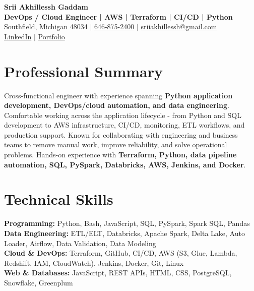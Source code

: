 \documentclass[letterpaper,10pt]{article}
\begin{document}
\fontsize{9.35pt}{10.45pt}\selectfont

\begin{center}
    {\LARGE \textbf{Srii Akhillessh Gaddam}} \\[-1pt]
    \textbf{DevOps / Cloud Engineer | AWS | Terraform | CI/CD | Python} \\[2pt]
    Southfield, Michigan 48034 $|$
    \href{tel:6468752400}{646-875-2400} $|$
    \href{mailto:sriiakhillessh@gmail.com}{sriiakhillessh@gmail.com} \\[1pt]
    \href{https://www.linkedin.com/in/srii-akhiilessh-gaddam-b48668191/}{LinkedIn} $|$
    \href{https://sriiakhillesshg.github.io/portfolio/}{Portfolio}
\end{center}
\vspace{-8pt}

\section{Professional Summary}
\small{Cross-functional engineer with experience spanning \textbf{Python application development, DevOps/cloud automation, and data engineering}. Comfortable working across the application lifecycle - from Python and SQL development to AWS infrastructure, CI/CD, monitoring, ETL workflows, and production support. Known for collaborating with engineering and business teams to remove manual work, improve reliability, and solve operational problems. Hands-on experience with \textbf{Terraform, Python, data pipeline automation, SQL, PySpark, Databricks, AWS, Jenkins, and Docker}.}

\section{Technical Skills}
\small{
\textbf{Programming:} Python, Bash, JavaScript, SQL, PySpark, Spark SQL, Pandas \\
\textbf{Data Engineering:} ETL/ELT, Databricks, Apache Spark, Delta Lake, Auto Loader, Airflow, Data Validation, Data Modeling \\
\textbf{Cloud \& DevOps:} Terraform, GitHub, CI/CD, AWS (S3, Glue, Lambda, Redshift, IAM, CloudWatch), Jenkins, Docker, Git, Linux \\
\textbf{Web \& Databases:} JavaScript, REST APIs, HTML, CSS, PostgreSQL, Snowflake, Greenplum
}
\end{document}
